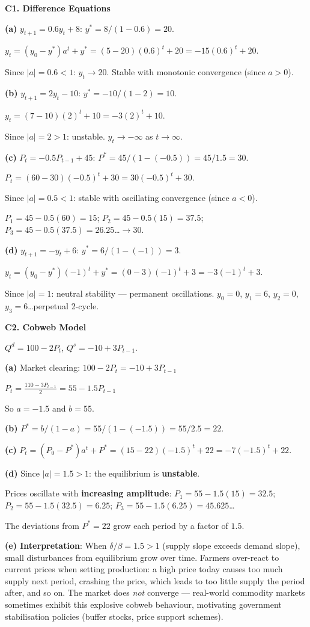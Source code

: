 \documentclass[12pt, a4paper]{article}
\theoremstyle{definition}
\begin{document}
\begin{solbox}
\textbf{C1. Difference Equations}

\textbf{(a)} $y_{t+1}=0.6y_t+8$: $y^*=8/(1-0.6)=20$.

$y_t=(y_0-y^*)a^t+y^*=(5-20)(0.6)^t+20=-15(0.6)^t+20$.

Since $|a|=0.6<1$: $y_t\to 20$. Stable with monotonic convergence (since $a>0$).

\textbf{(b)} $y_{t+1}=2y_t-10$: $y^*=-10/(1-2)=10$.

$y_t=(7-10)(2)^t+10=-3(2)^t+10$.

Since $|a|=2>1$: unstable. $y_t\to-\infty$ as $t\to\infty$.

\textbf{(c)} $P_t=-0.5P_{t-1}+45$: $P^*=45/(1-(-0.5))=45/1.5=30$.

$P_t=(60-30)(-0.5)^t+30=30(-0.5)^t+30$.

Since $|a|=0.5<1$: stable with oscillating convergence (since $a<0$).

$P_1=45-0.5(60)=15$; $P_2=45-0.5(15)=37.5$; $P_3=45-0.5(37.5)=26.25$\ldots $\to 30$.

\textbf{(d)} $y_{t+1}=-y_t+6$: $y^*=6/(1-(-1))=3$.

$y_t=(y_0-y^*)(-1)^t+y^*=(0-3)(-1)^t+3=-3(-1)^t+3$.

Since $|a|=1$: neutral stability --- permanent oscillations.
$y_0=0$, $y_1=6$, $y_2=0$, $y_3=6$\ldots perpetual 2-cycle.
\end{solbox}

\begin{solbox}
\textbf{C2. Cobweb Model}

$Q^d=100-2P_t$, $Q^s=-10+3P_{t-1}$.

\textbf{(a)} Market clearing: $100-2P_t=-10+3P_{t-1}$

$P_t=\frac{110-3P_{t-1}}{2}=55-1.5P_{t-1}$

So $a=-1.5$ and $b=55$.

\textbf{(b)} $P^*=b/(1-a)=55/(1-(-1.5))=55/2.5=22$.

\textbf{(c)} $P_t=(P_0-P^*)a^t+P^*=(15-22)(-1.5)^t+22=-7(-1.5)^t+22$.

\textbf{(d)} Since $|a|=1.5>1$: the equilibrium is \textbf{unstable}.

Prices oscillate with \textbf{increasing amplitude}: $P_1=55-1.5(15)=32.5$;
$P_2=55-1.5(32.5)=6.25$; $P_3=55-1.5(6.25)=45.625$\ldots

The deviations from $P^*=22$ grow each period by a factor of $1.5$.

\textbf{(e) Interpretation}: When $\delta/\beta=1.5>1$ (supply slope exceeds
demand slope), small disturbances from equilibrium grow over time. Farmers
over-react to current prices when setting production: a high price today
causes too much supply next period, crashing the price, which leads to too
little supply the period after, and so on. The market does \emph{not}
converge --- real-world commodity markets sometimes exhibit this explosive
cobweb behaviour, motivating government stabilisation policies (buffer stocks,
price support schemes).
\end{solbox}
\end{document}
